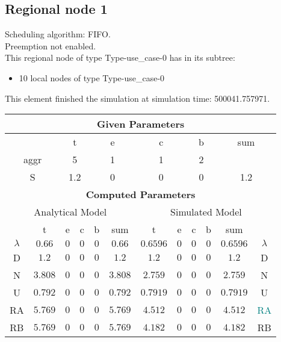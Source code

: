 \documentclass{article}
\begin{document}
\subsection{Regional node 1}
Scheduling algorithm: FIFO.\\Preemption not enabled. \\This regional node of type Type-use\_case-0 has in its subtree: \begin{itemize}
\item 10 local nodes of type Type-use\_case-0
\end{itemize}
This element finished the simulation at simulation time: 500041.757971.\\
\begin{table}[H]\centering\begin{tabular}{@{}c|cccc|c||cccc|c|c@{}}\toprule\multicolumn{12}{c}{\textbf{Given Parameters}}\\\midrule\multicolumn{2}{c|}{ } & \multicolumn{2}{c}{t} & \multicolumn{2}{c}{e} & \multicolumn{2}{c}{c} & \multicolumn{2}{c}{b} & \multicolumn{2}{|c}{sum} \\\midrule\multicolumn{2}{c|}{aggr} & \multicolumn{2}{c}{5} & \multicolumn{2}{c}{1} & \multicolumn{2}{c}{1} & \multicolumn{2}{c}{2} & \multicolumn{2}{|c}{ } \\ \midrule\multicolumn{2}{c|}{S} & \multicolumn{2}{c}{1.2} & \multicolumn{2}{c}{0} & \multicolumn{2}{c}{0} & \multicolumn{2}{c}{0} & \multicolumn{2}{|c}{1.2}\\ \midrule\midrule\multicolumn{12}{c}{\textbf{Computed Parameters}}\\ \midrule\multicolumn{6}{c||}{Analytical Model} & \multicolumn{6}{c}{Simulated Model}\\ 
 \midrule & t & e & c & b & sum & t & e & c & b & sum &  \\ \midrule$\lambda$ &$0.66$ & $0$ & $0$ & $0$ & $0.66$ & $0.6596$ & $0$ & $0$ & $0$ & $0.6596$& $\lambda$ \\D & $1.2$ & $0$ & $0$ & $0$ & $1.2$ & $1.2$ & $0$ & $0$ & $0$ & $1.2$& D\\N & $3.808$ & $0$ & $0$ & $0$ & $3.808$ & $2.759$ & $0$ & $0$ & $0$ & $2.759$& N\\U & $0.792$ & $0$ & $0$ & $0$ & $0.792$ & $0.7919$ & $0$ & $0$ & $0$ & $0.7919$& U\\RA & $5.769$ & $0$ & $0$ & $0$ & $5.769$ & $4.512$ & $0$ & $0$ & $0$ & $4.512$& \textcolor{teal}{RA}\\RB & $5.769$ & $0$ & $0$ & $0$ & $5.769$ & $4.182$ & $0$ & $0$ & $0$ & $4.182$& RB\\
\bottomrule
\end{tabular}
\end{table}
\filbreak
\end{document}
